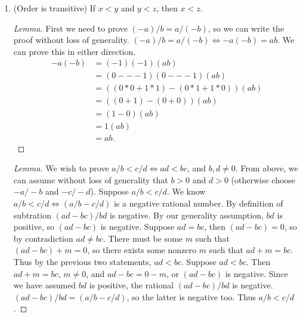 \documentclass[../../main.tex]{subfiles}
\begin{document}
\begin{enumerate}
\begin{proof}
        Suppose $y > x$. 
        Then $y-x$ is positive, i.e.
        $(cb - da) / db$ is positive.
        Then $(cb - da)$ and $(db)$ are both positive integers.
        If $(cb - da)$ is positive, its negation $-(cb - da)$ is negative.
        We know $-(cb - da) = (ad - bc)$ by negation and commutativity.
        Then $(ad - bc) / db$ is a negative rational. 
        Then so is $(x-y)$.
        Thus, $x < y$.
    \end{proof}
    \item 
    \begin{q}
        (Order is transitive) If $x < y$ and $y < z$, then $x < z$.
    \end{q}
    \begin{proof}[Lemma]
        First we need to prove $(-a)/b = a/(-b)$, so we can write the proof without loss of generality.
        $(-a)/b = a/(-b) \iff -a(-b) = ab$. We can prove this in either direction.
        \begin{align*}
            -a(-b) &= (-1)(-1)(ab) \\
            &= (0---1)(0---1)(ab) \\
            &= ((0*0 + 1*1)-(0*1+1*0))(ab) \\
            &= ((0+1)-(0+0))(ab) \\
            &= (1-0)(ab) \\
            &= 1(ab) \\
            &= ab.
        \end{align*} 
    \end{proof}
    \begin{proof}[Lemma]
        We wish to prove $a/b < c/d \iff ad < bc$, and $b, d \neq 0$.
        From above, we can assume without loss of generality that $b > 0$ and $d > 0$ (otherwise choose $-a/-b$ and $-c/-d$). 
        Suppose $a/b < c/d$.
        We know $a/b < c/d \iff (a/b - c/d)$ is a negative rational number.
        By definition of subtration $(ad - bc) / bd$ is negative. 
        By our generality assumption, $bd$ is positive, so $(ad-bc)$ is negative.
        Suppose $ad = bc$, then $(ad - bc) = 0$, so by contradiction $ad \neq bc$. 
        There must be some $m$ such that $(ad - bc) + m = 0$, 
        so there exists some nonzero $m$ such that $ad+m=bc$.
        Thus by the previous two statements, $ad < bc$.
        Suppose $ad < bc$.
        Then $ad+m=bc$, $m \neq 0$, and $ad - bc = 0 - m$, or $(ad-bc)$ is negative. 
        Since we have assumed $bd$ is positive, the rational $(ad - bc) / bd$ is negative. 
        $(ad - bc) / bd = (a/b - c/d)$, so the latter is negative too.
        Thus $a/b < c/d$.
        

\end{proof}
\end{enumerate}
\end{document}
